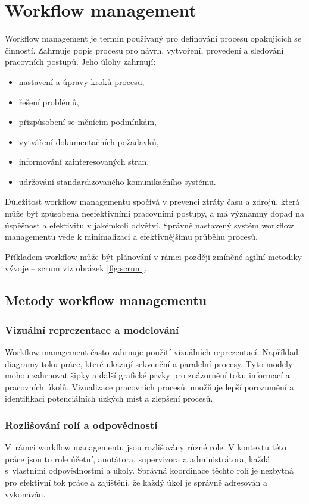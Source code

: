 \section{Workflow management}

Workflow management je termín používaný pro definování procesu opakujících se činností. Zahrnuje popis procesu pro návrh, vytvoření, provedení a sledování pracovních postupů. Jeho úlohy zahrnují:
\begin{itemize}
    \item nastavení a úpravy kroků procesu,
    \item řešení problémů,
    \item přizpůsobení se měnícím podmínkám,
    \item vytváření dokumentačních požadavků,
    \item informování zainteresovaných stran,
    \item udržování standardizovaného komunikačního systému.
\end{itemize}

Důležitost workflow managementu spočívá v prevenci ztráty času a zdrojů, která může být způsobena neefektivními pracovními postupy, a má významný dopad na úspěšnost a efektivitu v jakémkoli odvětví. Správně nastavený systém workflow managementu vede k minimalizaci a efektivnějšímu průběhu procesů. \cite{van_der_aalst_workflow_2004} 

Příkladem workflow může být plánování v rámci později zmíněné agilní metodiky vývoje -- scrum viz obrázek \vref{fig:scrum}.


\subsection{Metody workflow managementu}

\subsubsection{Vizuální reprezentace a modelování}
Workflow management často zahrnuje použití vizuálních reprezentací. Například diagramy toku práce, které ukazují sekvenční a paralelní procesy. Tyto modely mohou zahrnovat šipky a další grafické prvky pro znázornění toku informací a pracovních úkolů. Vizualizace pracovních procesů umožňuje lepší porozumění a identifikaci potenciálních úzkých míst a zlepšení procesů.

\subsubsection{Rozlišování rolí a odpovědností}
V~rámci workflow managementu jsou rozlišovány různé role. V kontextu této práce jsou to role účetní, anotátora, supervizora a administrátora, každá s~vlastními odpovědnostmi a úkoly. Správná koordinace těchto rolí je nezbytná pro efektivní tok práce a zajištění, že každý úkol je správně adresován a vykonáván.

